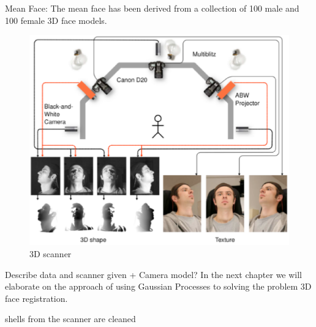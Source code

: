 Mean Face:
The mean face has been derived from a collection of 100 male and 100 female 3D face models.
\begin{figure}
\centering
\includegraphics[width=\textwidth]{./resources/figures/scanner.eps}
\caption{3D scanner}
\label{fig:scanner}
\end{figure}
Describe data and scanner given + Camera model?
In the next chapter we will elaborate on the approach of using Gaussian Processes to solving the problem 3D face registration.

shells from the scanner are cleaned

\nopagebreak




